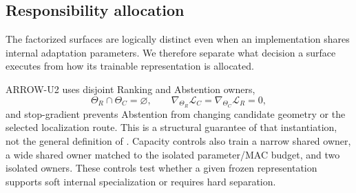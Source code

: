 \subsection{Responsibility allocation}
The factorized surfaces are logically distinct even when an implementation
shares internal adaptation parameters.  We therefore separate what decision a
surface executes from how its trainable representation is allocated.

ARROW-U2 uses disjoint Ranking and Abstention owners,
\begin{equation}
  \Theta_R\cap\Theta_C=\varnothing,\qquad
  \nabla_{\Theta_R}\mathcal{L}_C=
  \nabla_{\Theta_C}\mathcal{L}_R=0,
\end{equation}
and stop-gradient prevents Abstention from changing candidate geometry or the
selected localization route.  This is a structural guarantee of that
instantiation, not the general definition of \method.  Capacity controls also
train a narrow shared owner, a wide shared owner matched to the isolated
parameter/MAC budget, and two isolated owners.  These controls test whether a
given frozen representation supports soft internal specialization or requires
hard separation.
